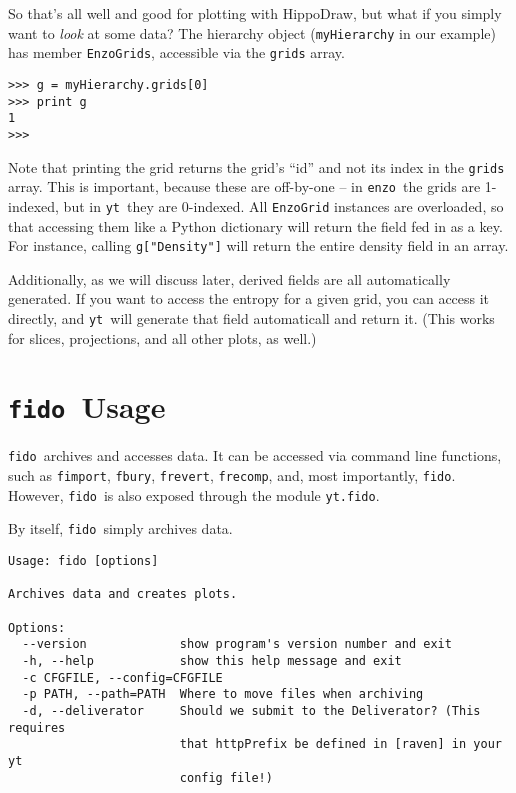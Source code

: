 \documentclass{article}
\newcommand{\fido}{\texttt{fido}}
\newcommand{\enzo}{\texttt{enzo}}
\newcommand{\yt}{\texttt{yt}}
\newcommand{\hd}{HippoDraw}
\begin{document}
So that's all well and good for plotting with \hd, but what if you simply want to
\textit{look} at some data?  The hierarchy object (\texttt{myHierarchy} in our
example) has member \texttt{EnzoGrids}, accessible via the \texttt{grids} array.

\begin{verbatim}
>>> g = myHierarchy.grids[0]
>>> print g
1
>>>
\end{verbatim}

Note that printing the grid returns the grid's ``id'' and not its index in the
\texttt{grids} array.  This is important, because these are off-by-one -- in \enzo\
the grids are 1-indexed, but in \yt\ they are 0-indexed.  All \texttt{EnzoGrid}
instances are overloaded, so that accessing them like a Python dictionary will
return the field fed in as a key.  For instance, calling \texttt{g["Density"]}
will return the entire density field in an array.

Additionally, as we will discuss later, derived fields are all automatically
generated.  If you want to access the entropy for a given grid, you can access it
directly, and \yt\ will generate that field automaticall and return it.  (This
works for slices, projections, and all other plots, as well.)

\clearpage
\section{\fido\ Usage}

\fido\ archives and accesses data.  It can be accessed via command line
functions, such as \texttt{fimport}, \texttt{fbury}, \texttt{frevert},
\texttt{frecomp}, and, most importantly, \texttt{fido}.  However, \fido\ is
also exposed through the module \texttt{yt.fido}.

By itself, \fido\ simply archives data. 

\begin{verbatim}
Usage: fido [options]

Archives data and creates plots.

Options:
  --version             show program's version number and exit
  -h, --help            show this help message and exit
  -c CFGFILE, --config=CFGFILE
  -p PATH, --path=PATH  Where to move files when archiving
  -d, --deliverator     Should we submit to the Deliverator? (This requires
                        that httpPrefix be defined in [raven] in your yt
                        config file!)
\end{verbatim}
\end{document}
